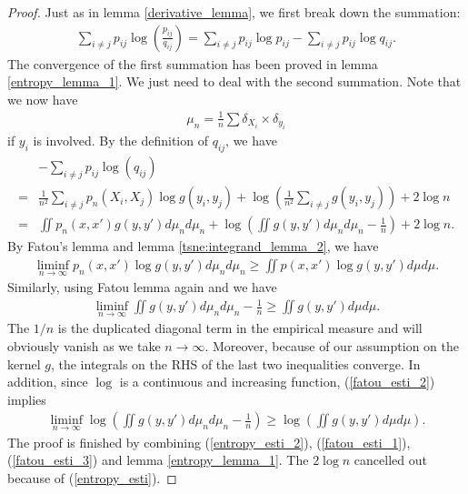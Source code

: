 \begin{proof}
    Just as in lemma \ref{derivative_lemma}, we first break down the summation:
    \begin{align}
        \sum_{i \neq j} p_{ij} \log \left(\frac{p_{ij}}{q_{ij}}\right) = \sum_{i \neq j} p_{ij} \log p_{ij} - \sum_{i \neq j} p_{ij} \log q_{ij}.
    \end{align}
    The convergence of the first summation has been proved in lemma \ref{entropy_lemma_1}. We just need to deal with the second summation. Note that we now have
    \begin{align}
        \mu_n = \frac{1}{n} \sum \delta_{X_i} \times \delta_{y_i}
    \end{align}
    if $y_i$ is involved. By the definition of $q_{ij}$, we have
    \begin{align} \label{entropy_esti_2}
          & -\sum_{i \neq j}p_{ij} \log(q_{ij}) \nonumber                                                                                             \\
        = & \frac{1}{n^2}\sum_{i \neq j} p_n(X_i,X_j) \log g(y_i,y_j) + \log \left(\frac{1}{n^2}\sum_{i \neq j} g(y_i,y_j)\right) +2 \log n \nonumber \\
        = & \iint p_n(x,x')g(y,y')d\mu_n d\mu_n + \log \left(\iint g(y,y')d\mu_n d\mu_n - \frac{1}{n}\right)+2\log n.
    \end{align}
    By Fatou's lemma and lemma \ref{tsne:integrand_lemma_2}, we have
    \begin{align} \label{fatou_esti_1}
        \liminf_{n \to \infty} p_n(x,x')\log g(y,y') d\mu_n d\mu_n \geq  \iint p(x,x')\log g(y,y') d\mu d\mu.
    \end{align}
    Similarly, using Fatou lemma again and we have
    \begin{align} \label{fatou_esti_2}
        \liminf_{n \to \infty} \iint g(y,y') d\mu_n d\mu_n - \frac{1}{n} \geq \iint g(y,y')d\mu d\mu.
    \end{align}
    The $1/n$ is the duplicated diagonal term in the empirical measure and will obviously vanish as we take $n \to \infty$. Moreover, because of our assumption on the kernel $g$, the integrals on the RHS of the last two inequalities converge. In addition, since $\log$ is a continuous and increasing function, (\ref{fatou_esti_2}) implies
    \begin{align} \label{fatou_esti_3}
        \liminf_{n \to \infty} \log \left(\iint g(y,y') d\mu_n d\mu_n - \frac{1}{n}\right) \geq \log \left(\iint g(y,y')d\mu d\mu \right).
    \end{align}
    The proof is finished by combining (\ref{entropy_esti_2}), (\ref{fatou_esti_1}), (\ref{fatou_esti_3}) and lemma \ref{entropy_lemma_1}. The $2 \log n$ cancelled out because of (\ref{entropy_esti}).
\end{proof}
